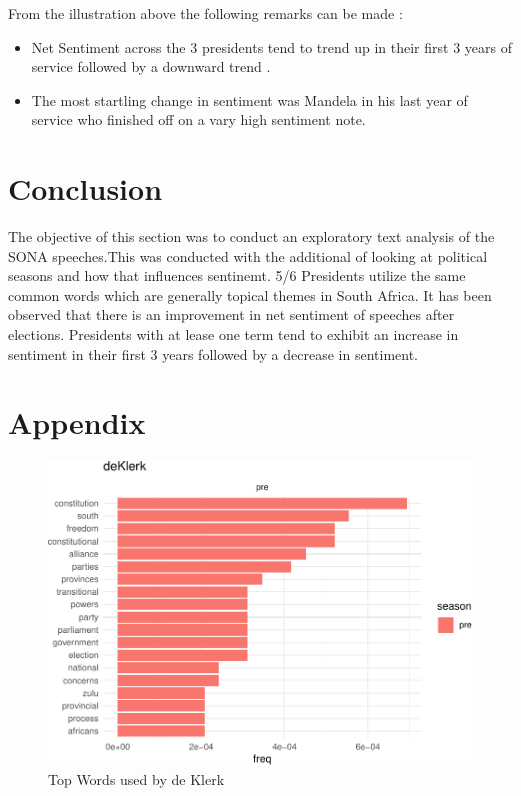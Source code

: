\documentclass[]{article}
\begin{document}
From the illustration above the following remarks can be made :

\begin{itemize}
\item Net Sentiment across the 3 presidents tend to trend up in their first 3 years of service followed by a downward trend .
\item The most startling change in sentiment was Mandela in his last year of service who finished off on a vary high sentiment note.
\end{itemize}

\section{Conclusion}\label{conclusion}

The objective of this section was to conduct an exploratory text
analysis of the SONA speeches.This was conducted with the additional of
looking at political seasons and how that influences sentinemt. 5/6
Presidents utilize the same common words which are generally topical
themes in South Africa. It has been observed that there is an
improvement in net sentiment of speeches after elections. Presidents
with at lease one term tend to exhibit an increase in sentiment in their
first 3 years followed by a decrease in sentiment.

\section{Appendix}\label{appendix}

\begin{figure}[H]

{\centering \includegraphics{datasci_fi_Assignment_2_files/figure-latex/deKlerk -1} 

}

\caption{Top Words used by de Klerk}\label{fig:deKlerk }
\end{figure}
\end{document}
